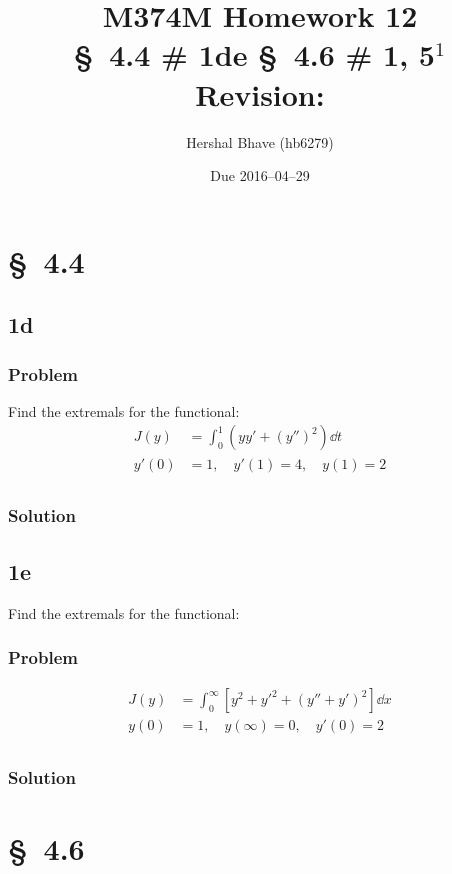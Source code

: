 \documentclass[12pt,twoside]{article}
\title{M374M Homework 12 \\
  \normalsize{\S~4.4 \# 1de \S~4.6 \# 1, 5$^1$} \\
  Revision: }
\author{Hershal Bhave (hb6279)}
\date{Due 2016--04--29}
\begin{document}
\maketitle

\section{\S~4.4}
\subsection{1d}
\subsubsection*{Problem}
Find the extremals for the functional:
\begin{equation}
  \label{eq:4.4.1d-problem}
  \begin{aligned}
    J(y) &= \int_0^1 (yy'+{(y'')}^2)\dd{t} \\
    y'(0) &= 1,\quad y'(1) = 4, \quad y(1) = 2 \\
  \end{aligned}
\end{equation}
\subsubsection*{Solution}
\todo{}

\subsection{1e}
Find the extremals for the functional:
\subsubsection*{Problem}
\begin{equation}
  \label{eq:4.4.1e-problem}
  \begin{aligned}
    J(y) &= \int_0^{\infty} [y^2 + {y'}^2 + {(y''+y')}^2]\dd{x} \\
    y(0) &= 1,\quad y(\infty) = 0, \quad y'(0) = 2 \\
  \end{aligned}
\end{equation}
\subsubsection*{Solution}
\todo{}

\section{\S~4.6}
\end{document}
